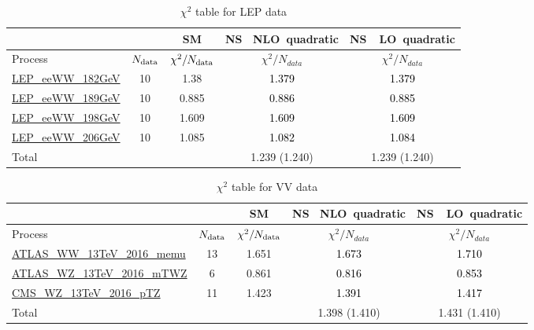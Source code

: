 \documentclass{article}
\begin{document}
\begin{table}[H]
\centering
\begin{tabular}{|l|c|c|c|c|}
\hline
 \multicolumn{2}{|c|}{} & SM& \rm NS \ NLO\ quadratic& \rm NS\ \ LO\ quadratic\\ \hline
Process & $N_{\rm data}$ & $\chi^ 2/N_{\rm data}$& $\chi^ 2/N_{data}$& $\chi^ 2/N_{data}$\\ \hline
\href{https://arxiv.org/abs/1302.3415}{LEP_eeWW_182GeV} & 10 & 1.38 & \textcolor{black}                            {1.379} & \textcolor{black}                            {1.379} \\ \hline
\href{https://arxiv.org/abs/1302.3415}{LEP_eeWW_189GeV} & 10 & 0.885 & \textcolor{black}                            {0.886} & \textcolor{black}                            {0.885} \\ \hline
\href{https://arxiv.org/abs/1302.3415}{LEP_eeWW_198GeV} & 10 & 1.609 & \textcolor{black}                            {1.609} & \textcolor{black}                            {1.609} \\ \hline
\href{https://arxiv.org/abs/1302.3415}{LEP_eeWW_206GeV} & 10 & 1.085 & \textcolor{black}                            {1.082} & \textcolor{black}                            {1.084} \\ \hline
\hline Total & &  & 1.239 (1.240) & 1.239 (1.240) \\ \hline
\end{tabular}
\caption{$\chi^2$ table for LEP data}
\end{table}
\begin{table}[H]
\centering
\begin{tabular}{|l|c|c|c|c|}
\hline
 \multicolumn{2}{|c|}{} & SM& \rm NS \ NLO\ quadratic& \rm NS\ \ LO\ quadratic\\ \hline
Process & $N_{\rm data}$ & $\chi^ 2/N_{\rm data}$& $\chi^ 2/N_{data}$& $\chi^ 2/N_{data}$\\ \hline
\href{https://arxiv.org/abs/1905.04242}{ATLAS_WW_13TeV_2016_memu} & 13 & 1.651 & \textcolor{black}                            {1.673} & \textcolor{black}                            {1.710} \\ \hline
\href{https://arxiv.org/abs/1902.05759}{ATLAS_WZ_13TeV_2016_mTWZ} & 6 & 0.861 & \textcolor{black}                            {0.816} & \textcolor{black}                            {0.853} \\ \hline
\href{https://arxiv.org/abs/1901.03428}{CMS_WZ_13TeV_2016_pTZ} & 11 & 1.423 & \textcolor{black}                            {1.391} & \textcolor{black}                            {1.417} \\ \hline
\hline Total & &  & 1.398 (1.410) & 1.431 (1.410) \\ \hline
\end{tabular}
\caption{$\chi^2$ table for VV data}
\end{table}
\end{document}
